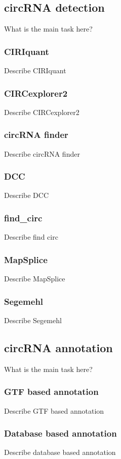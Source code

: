 \subsection{circRNA detection}
What is the main task here?

\subsubsection{CIRIquant}
Describe CIRIquant

\subsubsection{CIRCexplorer2}
Describe CIRCexplorer2

\subsubsection{circRNA finder}
Describe circRNA finder

\subsubsection{DCC}
Describe DCC

\subsubsection{find\_circ}
Describe find circ

\subsubsection{MapSplice}
Describe MapSplice

\subsubsection{Segemehl}
Describe Segemehl

\subsection{circRNA annotation}
What is the main task here?

\subsubsection{GTF based annotation}
Describe GTF based annotation

\subsubsection{Database based annotation}
Describe database based annotation

